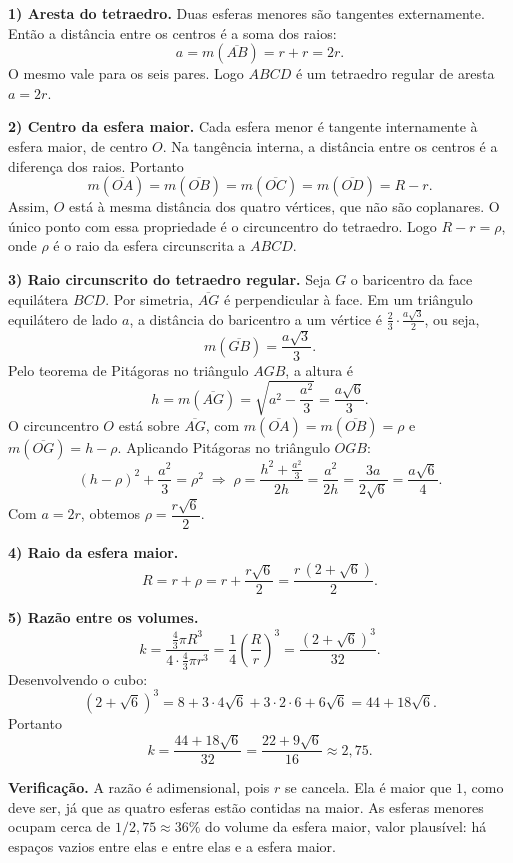 \documentclass{article}%
\begin{document}
\textbf{1) Aresta do tetraedro.} Duas esferas menores são tangentes externamente. Então a distância entre os centros é a soma dos raios:
\[
a = m(\overline{AB}) = r + r = 2r .
\]
O mesmo vale para os seis pares. Logo $ABCD$ é um tetraedro regular de aresta $a=2r$.

\textbf{2) Centro da esfera maior.} Cada esfera menor é tangente internamente à esfera maior, de centro $O$. Na tangência interna, a distância entre os centros é a diferença dos raios. Portanto
\[
m(\overline{OA}) = m(\overline{OB}) = m(\overline{OC}) = m(\overline{OD}) = R - r .
\]
Assim, $O$ está à mesma distância dos quatro vértices, que não são coplanares. O único ponto com essa propriedade é o circuncentro do tetraedro. Logo $R - r = \rho$, onde $\rho$ é o raio da esfera circunscrita a $ABCD$.

\textbf{3) Raio circunscrito do tetraedro regular.} Seja $G$ o baricentro da face equilátera $BCD$. Por simetria, $\overline{AG}$ é perpendicular à face. Em um triângulo equilátero de lado $a$, a distância do baricentro a um vértice é $\frac{2}{3}\cdot\frac{a\sqrt3}{2}$, ou seja,
\[
m(\overline{GB}) = \frac{a\sqrt3}{3}.
\]
Pelo teorema de Pitágoras no triângulo $AGB$, a altura é
\[
h = m(\overline{AG}) = \sqrt{a^2 - \frac{a^2}{3}} = \frac{a\sqrt6}{3}.
\]
O circuncentro $O$ está sobre $\overline{AG}$, com $m(\overline{OA}) = m(\overline{OB}) = \rho$ e $m(\overline{OG}) = h - \rho$. Aplicando Pitágoras no triângulo $OGB$:
\[
(h-\rho)^2 + \frac{a^2}{3} = \rho^2
\;\Longrightarrow\;
\rho = \frac{h^2 + \frac{a^2}{3}}{2h} = \frac{a^2}{2h} = \frac{3a}{2\sqrt6} = \frac{a\sqrt6}{4}.
\]
Com $a = 2r$, obtemos $\rho = \dfrac{r\sqrt6}{2}$.

\textbf{4) Raio da esfera maior.}
\[
R = r + \rho = r + \frac{r\sqrt6}{2} = \frac{r\,(2+\sqrt6)}{2}.
\]

\textbf{5) Razão entre os volumes.}
\[
k = \frac{\frac43\pi R^3}{4\cdot\frac43\pi r^3} = \frac{1}{4}\left(\frac{R}{r}\right)^3 = \frac{(2+\sqrt6)^3}{32}.
\]
Desenvolvendo o cubo:
\[
(2+\sqrt6)^3 = 8 + 3\cdot 4\sqrt6 + 3\cdot 2\cdot 6 + 6\sqrt6 = 44 + 18\sqrt6 .
\]
Portanto
\[
k = \frac{44+18\sqrt6}{32} = \frac{22+9\sqrt6}{16} \approx 2{,}75 .
\]

\textbf{Verificação.} A razão é adimensional, pois $r$ se cancela. Ela é maior que $1$, como deve ser, já que as quatro esferas estão contidas na maior. As esferas menores ocupam cerca de $1/2{,}75 \approx 36\%$ do volume da esfera maior, valor plausível: há espaços vazios entre elas e entre elas e a esfera maior.
\end{document}
